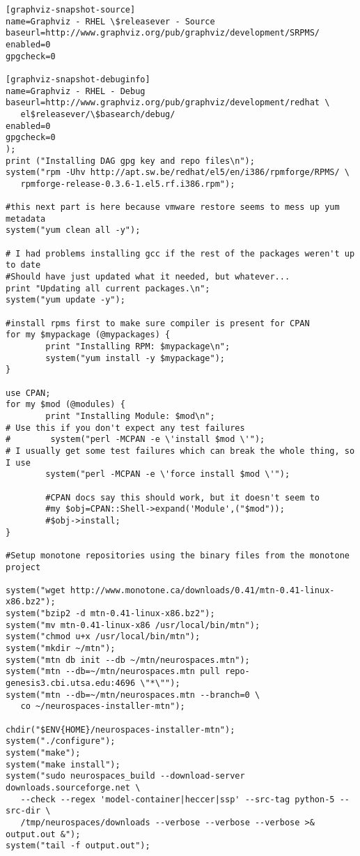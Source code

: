 \documentclass[12pt]{article}
\begin{document}
\begin{verbatim}
[graphviz-snapshot-source]
name=Graphviz - RHEL \$releasever - Source
baseurl=http://www.graphviz.org/pub/graphviz/development/SRPMS/
enabled=0
gpgcheck=0

[graphviz-snapshot-debuginfo]
name=Graphviz - RHEL - Debug
baseurl=http://www.graphviz.org/pub/graphviz/development/redhat \
   el$releasever/\$basearch/debug/
enabled=0
gpgcheck=0
);
print ("Installing DAG gpg key and repo files\n");
system("rpm -Uhv http://apt.sw.be/redhat/el5/en/i386/rpmforge/RPMS/ \
   rpmforge-release-0.3.6-1.el5.rf.i386.rpm");

#this next part is here because vmware restore seems to mess up yum metadata
system("yum clean all -y");

# I had problems installing gcc if the rest of the packages weren't up to date
#Should have just updated what it needed, but whatever...
print "Updating all current packages.\n";
system("yum update -y");

#install rpms first to make sure compiler is present for CPAN
for my $mypackage (@mypackages) {
        print "Installing RPM: $mypackage\n";
        system("yum install -y $mypackage");
}

use CPAN;
for my $mod (@modules) {
        print "Installing Module: $mod\n";
# Use this if you don't expect any test failures
#        system("perl -MCPAN -e \'install $mod \'");
# I usually get some test failures which can break the whole thing, so I use
        system("perl -MCPAN -e \'force install $mod \'");

        #CPAN docs say this should work, but it doesn't seem to
        #my $obj=CPAN::Shell->expand('Module',("$mod"));
        #$obj->install;
}

#Setup monotone repositories using the binary files from the monotone project

system("wget http://www.monotone.ca/downloads/0.41/mtn-0.41-linux-x86.bz2");
system("bzip2 -d mtn-0.41-linux-x86.bz2");
system("mv mtn-0.41-linux-x86 /usr/local/bin/mtn");
system("chmod u+x /usr/local/bin/mtn");
system("mkdir ~/mtn");
system("mtn db init --db ~/mtn/neurospaces.mtn");
system("mtn --db=~/mtn/neurospaces.mtn pull repo-genesis3.cbi.utsa.edu:4696 \"*\"");
system("mtn --db=~/mtn/neurospaces.mtn --branch=0 \
   co ~/neurospaces-installer-mtn");

chdir("$ENV{HOME}/neurospaces-installer-mtn");
system("./configure");
system("make");
system("make install");
system("sudo neurospaces_build --download-server downloads.sourceforge.net \
   --check --regex 'model-container|heccer|ssp' --src-tag python-5 --src-dir \
   /tmp/neurospaces/downloads --verbose --verbose --verbose >& output.out &");
system("tail -f output.out");
\end{verbatim}
\end{document}
